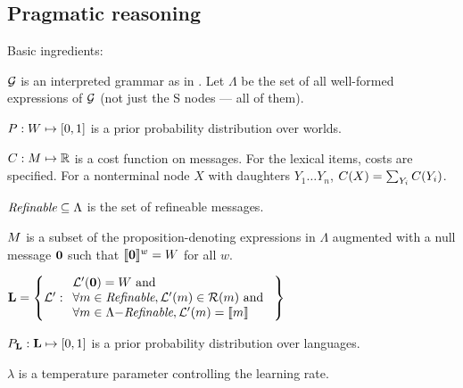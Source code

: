 \documentclass{article}
\begin{document}

\subsection{Pragmatic reasoning}\label{sec:model}

\begin{examples}
\item\label{modobjects} Basic ingredients:
  \begin{examples}
  \item $\mathcal{G}$ is an interpreted grammar as in . Let
    $\Lambda$ be the set of all well-formed expressions of $\mathcal{G}$
    (not just the S nodes --- all of them).

  \item $P : W \mapsto [0,1]$ is a prior probability
    distribution over worlds.

  \item $C : M \mapsto \mathbb{R}$ is a cost function on
    messages.  For the lexical items, costs are specified. For a
    nonterminal node $X$ with daughters $Y_{1} \ldots Y_{n}$,
    $C(X) = \sum_{Y_{i}}C(Y_{i})$.

  \item\label{enrichable}%
    $\textit{Refinable} \subseteq \Lambda$ is the set of refineable messages.

  \item $M$ is a subset of the proposition-denoting
    expressions in $\Lambda$ augmented with a null message $\mathbf{0}$
    such that $\llbracket\text{$\mathbf{0}$}\rrbracket^{w} = W$ for all $w$.

  \item\label{lexset}%
    $\mathbf{L} = \left\{ \mathcal{L}' :       
      \begin{array}[c]{l}
        \mathcal{L}'(\mathbf{0}) = W \text{ and } \\ 
        \forall m \in \textit{Refinable}, \mathcal{L}'(m) \in \mathcal{R}(m) \text{ and } \\
        \forall m \in \Lambda{-}\textit{Refinable}, \mathcal{L}'(m) = \llbracket m\rrbracket
      \end{array} \right\}$
  
  \item $P_{\mathbf{L}} : \mathbf{L} \mapsto [0,1]$ is a prior probability distribution over languages.    
  
  \item $\lambda$ is a temperature parameter controlling the learning rate.
  \end{examples}


\end{examples}
\end{document}
